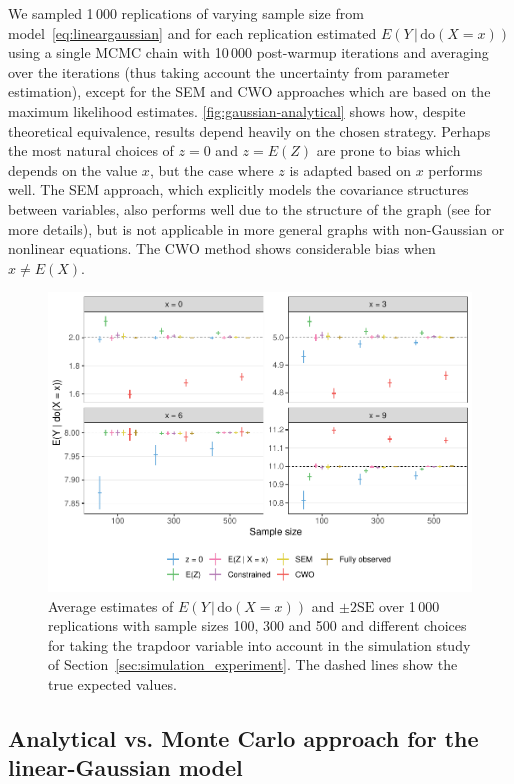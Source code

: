 \documentclass[11pt,a4paper,twoside]{article}
\newcommand{\+}[1]{\ensuremath{\mathbf{#1}}}
\newcommand{\doo}{\textrm{do}}
\newcommand{\given}{{ \, | \, }}
\begin{document}
	We sampled 1\,000 replications of varying sample size from model~\eqref{eq:lineargaussian} and for each replication estimated $E(Y \given \doo(X = x))$ using a single MCMC chain with 10\,000 post-warmup iterations and averaging over the iterations (thus taking account the uncertainty from parameter estimation), except for the SEM and CWO approaches which are based on the maximum likelihood estimates. \autoref{fig:gaussian-analytical} shows how, despite theoretical equivalence, results depend heavily on the chosen strategy. Perhaps the most natural choices of $z=0$ and $z=E(Z)$ are prone to bias which depends on the value $x$, but the case where $z$ is adapted based on $x$ performs well. The SEM approach, which explicitly models the covariance structures between variables, also performs well due to the structure of the graph (see \citet{sems2018} for more details), but is not applicable in more general graphs with non-Gaussian or nonlinear equations. The CWO method shows considerable bias when $x \neq E(X)$.
	\begin{figure}[!ht]
		\includegraphics[width=\textwidth]{figures/gaussian.pdf}
		\caption{Average estimates of $E(Y \given \doo(X = x))$ and $\pm 2 \textrm{SE}$ over 1\,000 replications with sample sizes 100, 300 and 500 and different choices for taking the trapdoor variable into account in the simulation study of Section~\ref{sec:simulation_experiment}. The dashed lines show the true expected values.}
		\label{fig:gaussian-analytical}
	\end{figure}
	
	
	\subsection{Analytical vs. Monte Carlo approach for the linear-Gaussian model}
	\label{sec:monte-carlo-example}
	
\end{document}
